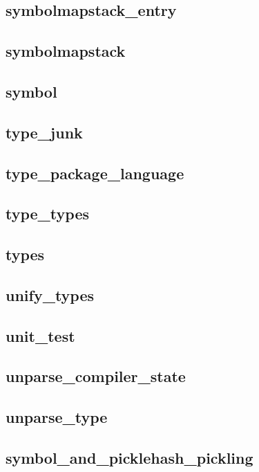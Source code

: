 \subsection{symbolmapstack\_entry}				
\subsection{symbolmapstack}					
\subsection{symbol}						
\subsection{type\_junk}						
\subsection{type\_package\_language}				
\subsection{type\_types}					
\subsection{types}						
\subsection{unify\_types}					
\subsection{unit\_test}						
\subsection{unparse\_compiler\_state}				
\subsection{unparse\_type}					
\subsection{symbol\_and\_picklehash\_pickling}			
